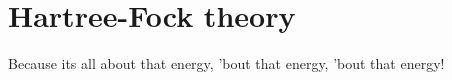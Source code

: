 \chapter{Hartree-Fock theory}
    Because its all about that energy, 'bout that energy, 'bout that energy!
